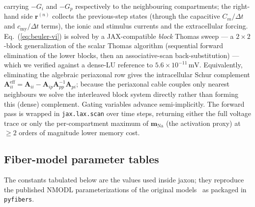 carrying $-G_i$ and $-G_p$ respectively to the neighbouring
compartments; the right-hand side $\mathbf{r}^{(n)}$ collects the
previous-step states (through the capacitive $C_m/\Delta t$ and
$c_{\mathrm{my}}/\Delta t$ terms), the ionic and stimulus currents and
the extracellular forcing.  Eq.~(\ref{eq:beuler-vi}) is solved by a
JAX-compatible \emph{block} Thomas sweep --- a $2\times2$-block
generalization of the scalar Thomas algorithm (sequential forward
elimination of the lower blocks, then an associative-scan
back-substitution) --- which we verified against a dense-LU reference
to $5.6\times10^{-11}\,\mathrm{mV}$.  Equivalently, eliminating the
algebraic periaxonal row gives the intracellular Schur complement
$\mathbf{A}_{ii}^{\mathrm{eff}} = \mathbf{A}_{ii} -
\mathbf{A}_{ip}\mathbf{A}_{pp}^{-1}\mathbf{A}_{pi}$; because the
periaxonal cable couples only nearest neighbours we solve the
interleaved block system directly rather than forming this (dense)
complement.  Gating variables advance semi-implicitly.  The forward
pass is wrapped in \texttt{jax.lax.scan} over time steps, returning
either the full voltage trace or only the per-compartment maximum of
$\mathbf{m}_{\mathrm{Na}}$ (the activation proxy) at $\ge\!2$ orders of
magnitude lower memory cost.

\subsection*{Fiber-model parameter tables}
\label{sec:app-models}

The constants tabulated below are the values used inside jaxon; they
reproduce the published NMODL parameterizations of the original
models~\cite{mcintyre2002,sundt2015,sweeney1987,rattay1989analysis}
as packaged in \texttt{pyfibers}.

